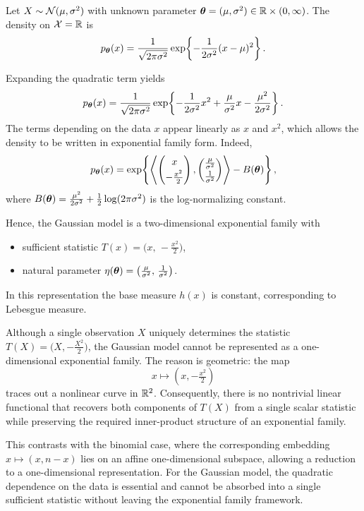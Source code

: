 \begin{ex}
Let \(X \sim \mathcal{N}(\mu,\sigma^2)\) with unknown parameter
\(\boldsymbol{\theta}=(\mu,\sigma^2)\in\mathbb{R}\times(0,\infty)\).
The density on \(\mathcal{X}=\mathbb{R}\) is
\[
p_{\boldsymbol{\theta}}(x)
= \frac{1}{\sqrt{2\pi\sigma^2}}
\exp\!\left\{-\frac{1}{2\sigma^2}(x-\mu)^2\right\}.
\]

Expanding the quadratic term yields
\[
p_{\boldsymbol{\theta}}(x)
= \frac{1}{\sqrt{2\pi\sigma^2}}
\exp\!\left\{
-\frac{1}{2\sigma^2}x^2
+ \frac{\mu}{\sigma^2}x
- \frac{\mu^2}{2\sigma^2}
\right\}.
\]
The terms depending on the data \(x\) appear linearly as \(x\) and \(x^2\), which allows the
density to be written in exponential family form. Indeed,
\[
p_{\boldsymbol{\theta}}(x)
= \exp\!\left\{
\left\langle
\begin{pmatrix} x \\[0.2em] -\frac{x^2}{2} \end{pmatrix},
\begin{pmatrix} \frac{\mu}{\sigma^2} \\[0.2em] \frac{1}{\sigma^2} \end{pmatrix}
\right\rangle
- B(\boldsymbol{\theta})
\right\},
\]
where
\(
B(\boldsymbol{\theta}) = \frac{\mu^2}{2\sigma^2} + \frac{1}{2}\log(2\pi\sigma^2)
\)
is the log-normalizing constant.

Hence, the Gaussian model is a two-dimensional exponential family with
\begin{itemize}
    \item sufficient statistic \(T(x) = \bigl(x,\,-\tfrac{x^2}{2}\bigr)\),
    \item natural parameter \(\eta(\boldsymbol{\theta}) = \bigl(\tfrac{\mu}{\sigma^2},\,\tfrac{1}{\sigma^2}\bigr)\).
\end{itemize}
In this representation the base measure \(h(x)\) is constant, corresponding to Lebesgue measure.
\end{ex}

Although a single observation \(X\) uniquely determines the statistic
\(T(X) = \bigl(X,-\tfrac{X^2}{2}\bigr)\), the Gaussian model cannot be represented
as a one-dimensional exponential family.
The reason is geometric: the map
\[
x \longmapsto \left(x,-\tfrac{x^2}{2}\right)
\]
traces out a nonlinear curve in \(\mathbb{R}^2\).
Consequently, there is no nontrivial linear functional that recovers both
components of \(T(X)\) from a single scalar statistic while preserving the
required inner-product structure of an exponential family.

This contrasts with the binomial case, where the corresponding embedding
\(
x \mapsto (x,n-x)
\)
lies on an affine one-dimensional subspace, allowing a reduction to a
one-dimensional representation.
For the Gaussian model, the quadratic dependence on the data is essential and
cannot be absorbed into a single sufficient statistic without leaving the
exponential family framework.

